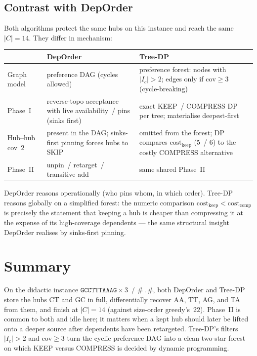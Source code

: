 \documentclass[11pt,a4paper]{article}
\begin{document}
\subsection{Contrast with DepOrder}

Both algorithms protect the same hubs on this instance and reach the
same \(|C|=14\). They differ in mechanism:

\begin{center}
\small
\begin{tabular}{@{}p{2.8cm}p{5.6cm}p{5.6cm}@{}}
\toprule
 & DepOrder & Tree-DP \\
\midrule
Graph model &
  preference DAG (cycles allowed) &
  preference forest:
  nodes with \(|I_c|>2\);
  edges only if \(\mathrm{cov}\ge 3\)
  (cycle-breaking) \\
Phase~I &
  reverse-topo acceptance with live
  availability~/ pins (sinks first) &
  exact KEEP~/ COMPRESS DP per tree;
  materialise deepest-first \\
Hub--hub cov~$2$ &
  present in the DAG; sinks-first
  pinning forces hubs to SKIP &
  omitted from the forest; DP compares
  \(\mathrm{cost}_{\mathrm{keep}}\)
  (\(5\)~/ \(6\)) to the costly COMPRESS
  alternative \\
Phase~II &
  unpin~/ retarget~/ transitive add &
  same shared Phase~II \\
\bottomrule
\end{tabular}
\end{center}

DepOrder reasons operationally (who pins whom, in which order).
Tree-DP reasons globally on a simplified forest: the numeric comparison
\(\mathrm{cost}_{\mathrm{keep}}<\mathrm{cost}_{\mathrm{comp}}\) is
precisely the statement that keeping a hub is cheaper than
compressing it at the expense of its high-coverage dependents --- the
same structural insight DepOrder realises by sinks-first pinning.

\section{Summary}

On the didactic instance
\(\mathtt{GCCTTTAAAG}{\times}3\)~/ \(\mathtt{\#\,.\,\#}\), both
DepOrder and Tree-DP store the hubs CT and GC in full, differentially
recover AA, TT, AG, and TA from them, and finish at \(|C|=14\)
(against size-order greedy's~$22$). Phase~II is common to both and
idle here; it matters when a kept hub should later be lifted onto a
deeper source after dependents have been retargeted. Tree-DP's
filters \(|I_c|>2\) and \(\mathrm{cov}\ge 3\) turn the cyclic
preference DAG into a clean two-star forest on which KEEP versus
COMPRESS is decided by dynamic programming.
\end{document}
